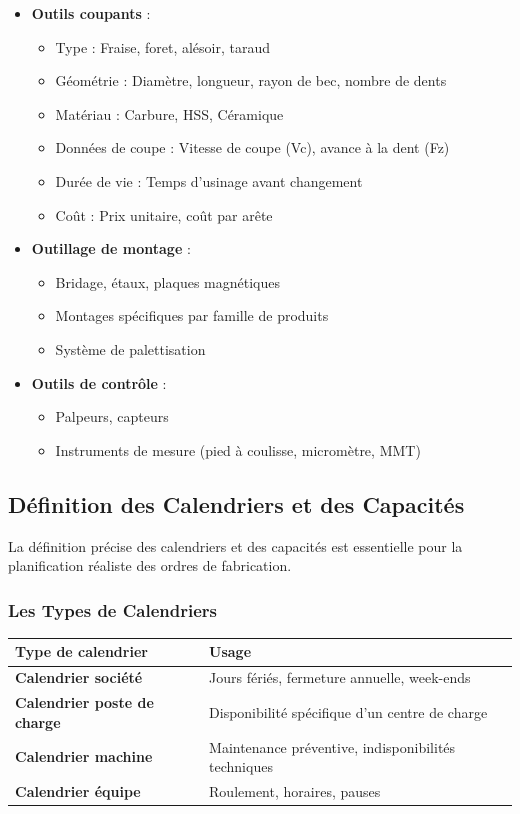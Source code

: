 \documentclass{article}
\begin{document}
\begin{itemize}
    \item \textbf{Outils coupants} :
    \begin{itemize}
        \item Type : Fraise, foret, alésoir, taraud
        \item Géométrie : Diamètre, longueur, rayon de bec, nombre de dents
        \item Matériau : Carbure, HSS, Céramique
        \item Données de coupe : Vitesse de coupe (Vc), avance à la dent (Fz)
        \item Durée de vie : Temps d'usinage avant changement
        \item Coût : Prix unitaire, coût par arête
    \end{itemize}
    \item \textbf{Outillage de montage} :
    \begin{itemize}
        \item Bridage, étaux, plaques magnétiques
        \item Montages spécifiques par famille de produits
        \item Système de palettisation
    \end{itemize}
    \item \textbf{Outils de contrôle} :
    \begin{itemize}
        \item Palpeurs, capteurs
        \item Instruments de mesure (pied à coulisse, micromètre, MMT)
    \end{itemize}
\end{itemize}

\subsection{Définition des Calendriers et des Capacités}

La définition précise des calendriers et des capacités est essentielle pour la planification réaliste des ordres de fabrication.

\subsubsection{Les Types de Calendriers}

\begin{tabular}{|p{}|p{}|}
\hline
\textbf{Type de calendrier} & \textbf{Usage} \\
\hline
\textbf{Calendrier société} & Jours fériés, fermeture annuelle, week-ends \\
\hline
\textbf{Calendrier poste de charge} & Disponibilité spécifique d'un centre de charge \\
\hline
\textbf{Calendrier machine} & Maintenance préventive, indisponibilités techniques \\
\hline
\textbf{Calendrier équipe} & Roulement, horaires, pauses \\
\hline
\end{tabular}
\end{document}

